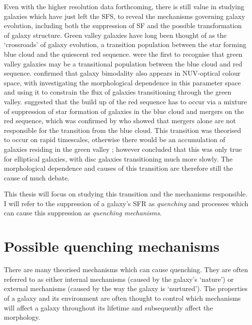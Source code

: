 Even with the higher resolution data forthcoming, there is still value in studying galaxies which have just left the SFS, to reveal the mechanisms governing galaxy evolution, including both the suppression of SF and the possible transformation of galaxy structure. Green valley galaxies have long been thought of as the `crossroads' of galaxy evolution, a transition population between the star forming blue cloud and the quiescent red sequence. \citet{Bell04} were the first to recognise that green valley galaxies may be a transitional population between the blue cloud and red sequence. \citet{Wyder07} confirmed that galaxy bimodality also appears in NUV-optical colour space, with \citet{Schim07} investigating the morphological dependence in this parameter space and \citet{Martin07} using it to constrain the flux of galaxies transitioning through the green valley. \citet{Faber07} suggested that the build up of the red sequence has to occur via a mixture of suppression of star formation of galaxies in the blue cloud and mergers on the red sequence, which was confirmed by \citet{Mendez11} who showed that mergers alone are not responsible for the transition from the blue cloud. This transition was theorised to occur on rapid timescales, otherwise there would be an accumulation of galaxies residing in the green valley \citep{Gonc12}; however \citet{schawinski14} concluded that this was only true for elliptical galaxies, with disc galaxies transitioning much more slowly. The morphological dependence and causes of this transition are therefore still the cause of much debate. 


This thesis will focus on studying this transition and the mechanisms responsible. I will refer to the suppression of a galaxy's SFR as \emph{quenching} and processes which can cause this suppression as \emph{quenching mechanisms}. 

\section{Possible quenching mechanisms}\label{sec:quenchmech}

There are many theorised mechanisms which can cause quenching. They are often referred to as either internal mechanisms (caused by the galaxy's `nature') or external mechanisms (caused by the way the galaxy is `nurtured'). The properties of a galaxy and its environment are often thought to control which mechanisms will affect a galaxy throughout its lifetime and subsequently affect the morphology. 

